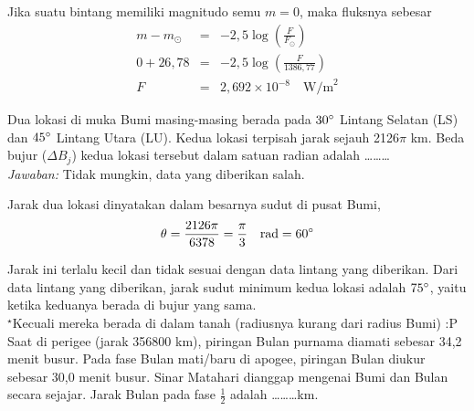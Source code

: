 \documentclass[11pt,fleqn]{exam}
\begin{document}
\begin{questions}
Jika suatu bintang memiliki magnitudo semu $m = 0$, maka fluksnya sebesar
\begin{eqnarray*}
m - m_{\odot} &=& -2,5 \log\left(\frac{F}{F_{\odot}}\right)\\
0 + 26,78 &=& -2,5 \log\left(\frac{F}{1386,77}\right)\\
F &=&   2,692 \times 10^{-8} \quad \text{W/m}^{2}
\end{eqnarray*}


\vspace{0.3cm}
\question Dua lokasi di muka Bumi masing-masing berada pada $30\degree$ Lintang Selatan (LS) dan $45\degree$ Lintang Utara (LU). Kedua lokasi terpisah jarak sejauh 2126$\pi$ km. Beda bujur ($\Delta B_j$) kedua lokasi tersebut dalam satuan radian adalah \ldots\ldots\ldots\\

\textit{Jawaban: } Tidak mungkin, data yang diberikan salah.

Jarak dua lokasi dinyatakan dalam besarnya sudut di pusat Bumi,
\begin{equation*}
\theta = \frac{2126 \pi }{6378} = \frac{\pi}{3} \quad \text{rad} = 60\degree
\end{equation*}

Jarak ini terlalu kecil dan tidak sesuai dengan data lintang yang diberikan. Dari data lintang yang diberikan, jarak sudut minimum kedua lokasi adalah $75\degree$, yaitu ketika keduanya berada di bujur yang sama.\\


$^\star$Kecuali mereka berada di dalam tanah (radiusnya kurang dari radius Bumi) :P\\

\vspace{0.3cm}
\question Saat di perigee (jarak 356800 km), piringan Bulan purnama diamati sebesar 34,2 menit busur. Pada fase Bulan mati/baru di apogee, piringan Bulan diukur sebesar 30,0 menit busur. Sinar Matahari dianggap mengenai Bumi dan Bulan secara sejajar. Jarak Bulan pada fase $\frac{1}{2}$ adalah \ldots\ldots\ldots km.\\



\end{questions}
\end{document}
